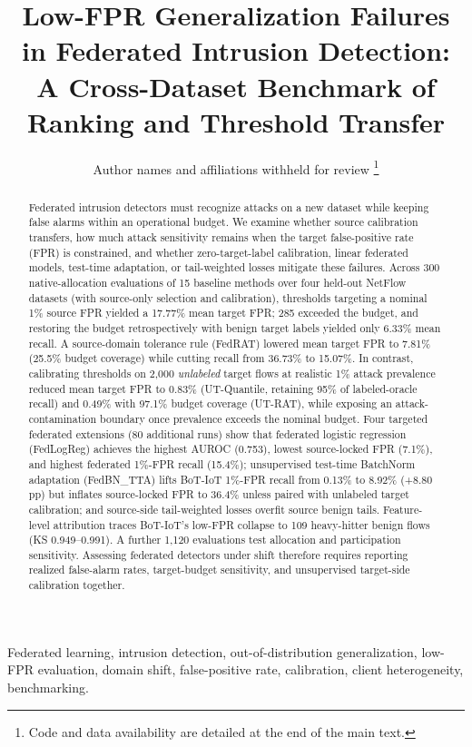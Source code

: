 \documentclass[journal,10pt]{IEEEtran}
\begin{document}
\title{Low-FPR Generalization Failures in Federated Intrusion Detection: A Cross-Dataset Benchmark of Ranking and Threshold Transfer}

\author{Author names and affiliations withheld for review%
\thanks{Code and data availability are detailed at the end of the main text.}}
\maketitle
\begin{abstract}
Federated intrusion detectors must recognize attacks on a new dataset while keeping false alarms within an operational budget. We examine whether source calibration transfers, how much attack sensitivity remains when the target false-positive rate (FPR) is constrained, and whether zero-target-label calibration, linear federated models, test-time adaptation, or tail-weighted losses mitigate these failures. Across 300 native-allocation evaluations of 15 baseline methods over four held-out NetFlow datasets (with source-only selection and calibration), thresholds targeting a nominal 1\% source FPR yielded a 17.77\% mean target FPR; 285 exceeded the budget, and restoring the budget retrospectively with benign target labels yielded only 6.33\% mean recall. A source-domain tolerance rule (FedRAT) lowered mean target FPR to 7.81\% (25.5\% budget coverage) while cutting recall from 36.73\% to 15.07\%. In contrast, calibrating thresholds on 2,000 \emph{unlabeled} target flows at realistic 1\% attack prevalence reduced mean target FPR to 0.83\% (UT-Quantile, retaining 95\% of labeled-oracle recall) and 0.49\% with 97.1\% budget coverage (UT-RAT), while exposing an attack-contamination boundary once prevalence exceeds the nominal budget. Four targeted federated extensions (80 additional runs) show that federated logistic regression (FedLogReg) achieves the highest AUROC (0.753), lowest source-locked FPR (7.1\%), and highest federated 1\%-FPR recall (15.4\%); unsupervised test-time BatchNorm adaptation (FedBN\_TTA) lifts BoT-IoT 1\%-FPR recall from 0.13\% to 8.92\% (+8.80\,pp) but inflates source-locked FPR to 36.4\% unless paired with unlabeled target calibration; and source-side tail-weighted losses overfit source benign tails. Feature-level attribution traces BoT-IoT's low-FPR collapse to 109 heavy-hitter benign flows (KS 0.949--0.991). A further 1,120 evaluations test allocation and participation sensitivity. Assessing federated detectors under shift therefore requires reporting realized false-alarm rates, target-budget sensitivity, and unsupervised target-side calibration together.

\end{abstract}
\begin{IEEEkeywords}
Federated learning, intrusion detection, out-of-distribution generalization, low-FPR evaluation, domain shift, false-positive rate, calibration, client heterogeneity, benchmarking.
\end{IEEEkeywords}
\end{document}
